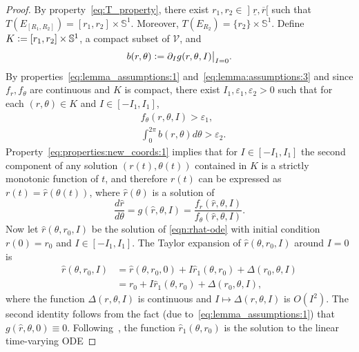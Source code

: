 \documentclass[journal,twoside,web, twocolumn,draftcls]{ieeecolor}
\newcommand*{\Sone}{\mathbb{S}^1}
\newcommand*{\cV}{\mathcal{V}}
\newcommand*{\eqdef}{\vcentcolon=}
\begin{document}
\begin{proof}
By property~\eqref{eq:T_property}, there exist $r_1,r_2 \in \mathopen]\underline{r},\overline{r}[$ such that $T(E_{[R_1,R_2]}) = [r_1,r_2]\times \Sone$. Moreover, $T(E_{R_2}) = \{r_2 \} \times \Sone$. Define $K \eqdef [r_1,r_2]\times \Sone$, a compact subset of $\cV$, and 
\begin{equation}\label{eq:b_defn}
b(r,\theta) \eqdef \partial_I g(r,\theta,I)\big|_{I=0}.
\end{equation}
By properties~\eqref{eq:lemma_assumptions:1} and~\eqref{eq:lemma:assumptions:3}
and since $f_r, f_\theta$ are continuous and $K$ is compact, there exist
$I_1,\varepsilon_1,\varepsilon_2>0$ such that for each $(r,\theta) \in K$ and $I
\in [-I_1,I_1]$,
\begin{subequations}
\label{eq:properties:new_coords}
\begin{align}
&f_\theta(r,\theta,I) > \varepsilon_1,\label{eq:properties:new_coords:1}\\
& \int_0^{2\pi} b(r,\theta) d \theta > \varepsilon_2.\label{eq:properties:new_coords:2}
\end{align}
\end{subequations}
Property~\eqref{eq:properties:new_coords:1} implies that for $I \in [-I_1,I_1]$
the second component of any solution $(r(t),\theta(t))$ contained in $K$ is a
strictly monotonic function of $t$, and therefore $r(t)$  can be expressed as
$r(t) = \hat r(\theta(t))$, where $\hat r(\theta)$ is a solution of
    \begin{equation}\label{eqn:rhat-ode}
            \frac{d \hat r}{d \theta} = g(\hat r,\theta,I) = \frac{f_r(\hat r,\theta,I)}{f_\theta(\hat r,\theta,I)}. %
    \end{equation}
Now let \(\hat{r}(\theta,r_0,I)\) be the solution of \eqref{eqn:rhat-ode} with initial condition $r(0)=r_0$ and $I\in [-I_1,I_1]$. The Taylor expansion of $\hat{r}(\theta,r_0,I)$ around \(I = 0\) is
\begin{equation}\label{eq:Taylor_exp}
\begin{aligned}
\hat{r}(\theta,r_0,I) &= \hat{r}(\theta,r_0,0) + I\hat{r}_1(\theta,r_0) 
    + \Delta(r_0,\theta,I) \\
%
&=r_0 + I\hat{r}_1(\theta,r_0) + \Delta(r_0,\theta,I),
\end{aligned}
\end{equation}
where the function $\Delta(r,\theta,I)$ is continuous and $I \mapsto
\Delta(r,\theta,I)$ is $O(I^2)$.
The second identity follows from the fact (due to~\eqref{eq:lemma_assumptions:1}) that \(g(\hat{r},\theta,0) \equiv 0\). Following~\cite[Chapter 10]{khalil_nonlinear}, the function \(\hat{r}_1(\theta,r_0)\) is the solution to the linear time-varying ODE

\end{proof}
\end{document}
